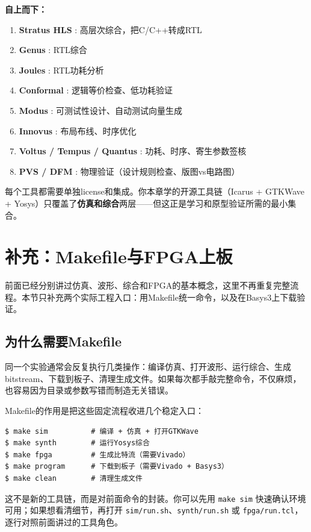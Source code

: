 \documentclass[11pt,a4paper]{article}
\begin{document}
\textbf{自上而下：}
\begin{enumerate}
  \item \textbf{Stratus HLS} : 高层次综合，把C/C++转成RTL
  \item \textbf{Genus} : RTL综合
  \item \textbf{Joules} : RTL功耗分析
  \item \textbf{Conformal} : 逻辑等价检查、低功耗验证
  \item \textbf{Modus} : 可测试性设计、自动测试向量生成
  \item \textbf{Innovus} : 布局布线、时序优化
  \item \textbf{Voltus / Tempus / Quantus} : 功耗、时序、寄生参数签核
  \item \textbf{PVS / DFM} : 物理验证（设计规则检查、版图vs电路图）
\end{enumerate}

每个工具都需要单独license和集成。你本章学的开源工具链（Icarus + GTKWave + Yosys）只覆盖了\textbf{仿真和综合}两层——但这正是学习和原型验证所需的最小集合。

\section{补充：Makefile与FPGA上板}

前面已经分别讲过仿真、波形、综合和FPGA的基本概念，这里不再重复完整流程。本节只补充两个实际工程入口：用Makefile统一命令，以及在Basys3上下载验证。

\subsection{为什么需要Makefile}

同一个实验通常会反复执行几类操作：编译仿真、打开波形、运行综合、生成bitstream、下载到板子、清理生成文件。如果每次都手敲完整命令，不仅麻烦，也容易因为目录或参数写错而制造无关错误。

Makefile的作用是把这些固定流程收进几个稳定入口：

\begin{lstlisting}[style=shell]
$ make sim          # 编译 + 仿真 + 打开GTKWave
$ make synth        # 运行Yosys综合
$ make fpga         # 生成比特流（需要Vivado）
$ make program      # 下载到板子（需要Vivado + Basys3）
$ make clean        # 清理生成文件
\end{lstlisting}

这不是新的工具链，而是对前面命令的封装。你可以先用 \texttt{make sim} 快速确认环境可用；如果想看清细节，再打开 \texttt{sim/run.sh}、\texttt{synth/run.sh} 或 \texttt{fpga/run.tcl}，逐行对照前面讲过的工具角色。
\end{document}
